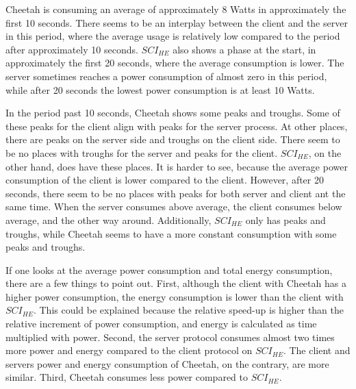 \documentclass[../thesis.tex]{subfiles}
\begin{document}
Cheetah is consuming an average of approximately 8 Watts in approximately the first 10 seconds. There seems to be an interplay between the client and the server in this period, where the average usage is relatively low compared to the period after approximately 10 seconds. $SCI_{HE}$ also shows a phase at the start, in approximately the first 20 seconds, where the average consumption is lower. The server sometimes reaches a power consumption of almost zero in this period, while after 20 seconds the lowest power consumption is at least 10 Watts. 

In the period past 10 seconds, Cheetah shows some peaks and troughs. Some of these peaks for the client align with peaks for the server process. At other places, there are peaks on the server side and troughs on the client side. There seem to be no places with troughs for the server and peaks for the client. $SCI_{HE}$, on the other hand, does have these places. It is harder to see, because the average power consumption of the client is lower compared to the client. However, after 20 seconds, there seem to be no places with peaks for both server and client ant the same time. When the server consumes above average, the client consumes below average, and the other way around. Additionally, $SCI_{HE}$ only has peaks and troughs, while Cheetah seems to have a more constant consumption with some peaks and troughs. 

If one looks at the average power consumption and total energy consumption, there are a few things to point out. First, although the client with Cheetah has a higher power consumption, the energy consumption is lower than the client with $SCI_{HE}$. This could be explained because the relative speed-up is higher than the relative increment of power consumption, and energy is calculated as time multiplied with power. Second, the server protocol consumes almost two times more power and energy compared to the client protocol on $SCI_{HE}$. The client and servers power and energy consumption of Cheetah, on the contrary, are more similar. Third, Cheetah consumes less power compared to $SCI_{HE}$. 
\end{document}
